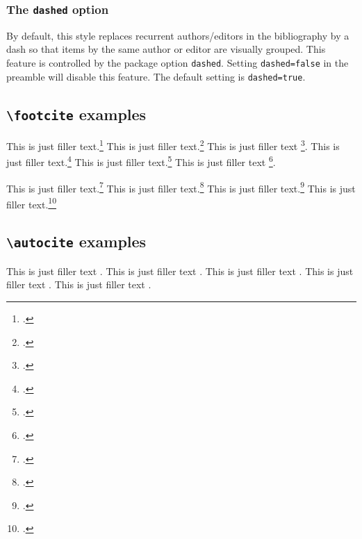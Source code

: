 \documentclass[a4paper]{article}
\newcommand{\cmd}[1]{\texttt{\textbackslash #1}}
\begin{document}
\subsubsection*{The \texttt{dashed} option}

By default, this style replaces recurrent authors/editors in the
bibliography by a dash so that items by the same author or editor
are visually grouped. This feature is controlled by the package
option \texttt{dashed}. Setting \texttt{dashed=false} in the
preamble will disable this feature. The default setting is
\texttt{dashed=true}.

\clearpage

\subsection*{\cmd{footcite} examples}

This is just filler text.\footcite{aristotle:anima}
This is just filler text.\footcite{aristotle:physics}
This is just filler text \footcite{averroes/bland}.
This is just filler text.\footcite{aristotle:anima}
This is just filler text.\footcite{aristotle:physics}
This is just filler text \footcite{averroes/bland}.

\clearpage

This is just filler text.\footcite{kant:kpv}
This is just filler text.\footcite{kant:ku}
This is just filler text.\footcite[24]{kant:kpv}
This is just filler text.\footcite[59--63]{kant:ku}

\clearpage

\subsection*{\cmd{autocite} examples}


This is just filler text \autocite{aristotle:rhetoric}.
This is just filler text \autocite{aristotle:rhetoric}.
This is just filler text \autocite{aristotle:anima}.
This is just filler text \autocite{aristotle:physics}.
This is just filler text \autocite{averroes/bland}.

\clearpage


\printshorthands
\printbibliography
\end{document}
